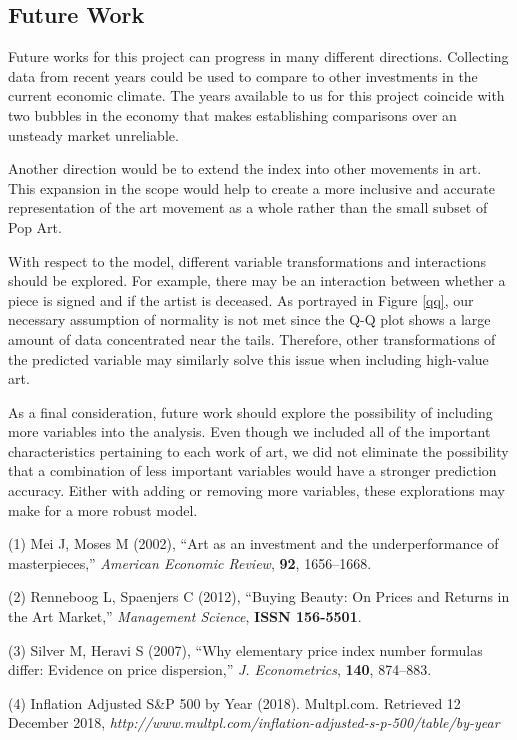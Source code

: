 \documentclass[]{asaproc}\usepackage[]{graphicx}\usepackage[]{color}
\begin{document}
\subsection{Future Work}

Future works for this project can progress in many different directions. Collecting data from recent years could be used to compare to other investments in the current economic climate. The years available to us for this project coincide with two bubbles in the economy that makes establishing comparisons over an unsteady market unreliable. 

Another direction would be to extend the index into other movements in art. This expansion in the scope would help to create a more inclusive and accurate representation of the art movement as a whole rather than the small subset of Pop Art. 

With respect to the model, different variable transformations and interactions should be explored. For example, there may be an interaction between whether a piece is signed and if the artist is deceased. As portrayed in Figure \ref{qq}, our necessary assumption of normality is not met since the Q-Q plot shows a large amount of data concentrated near the tails. Therefore, other transformations of the predicted variable may similarly solve this issue when including high-value art.

As a final consideration, future work should explore the possibility of including more variables into the analysis. Even though we included all of the important characteristics pertaining to each work of art, we did not eliminate the possibility that a combination of less important variables would have a stronger prediction accuracy. Either with adding or removing more variables, these explorations may make for a more robust model.




\begin{references}
{\footnotesize
\itemsep=3pt

\item (1) Mei J, Moses M (2002),  ``Art as an investment and the underperformance of masterpieces,''
{\em American Economic Review}, {\bf 92}, 1656–1668.
\item (2) Renneboog L, Spaenjers C (2012),  ``Buying Beauty: On Prices and Returns in the Art Market,''  {\em Management Science}, {\bf ISSN 156-5501}. 
\item (3) Silver M, Heravi S (2007), ``Why elementary price index number formulas differ: Evidence on price dispersion,'' {\em J. Econometrics}, {\bf 140}, 874–883.
\item (4) Inflation Adjusted S\&P 500 by Year (2018). Multpl.com. Retrieved 12 December 2018, {\em http://www.multpl.com/inflation-adjusted-s-p-500/table/by-year}
}
\end{references}
\end{document}
